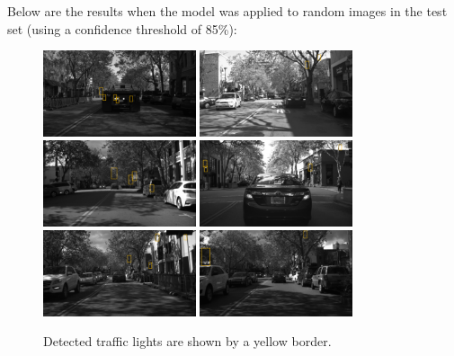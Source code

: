 \documentclass[a4paper]{article}
\begin{document}
 Below are the results when the model was applied to random images in the test set (using a confidence threshold of 85\%):
\begin{figure}[!htb]
\centering
\includegraphics[width=0.4\textwidth]{25430.png}
\includegraphics[width=0.4\textwidth]{28028.png}
\includegraphics[width=0.4\textwidth]{38314.png}
\includegraphics[width=0.4\textwidth]{37750.png}
\includegraphics[width=0.4\textwidth]{39580.png}
\includegraphics[width=0.4\textwidth]{39696.png}
    \caption{\label{fig:masks} Detected traffic lights are shown by a yellow border.}
\end{figure}
\end{document}
